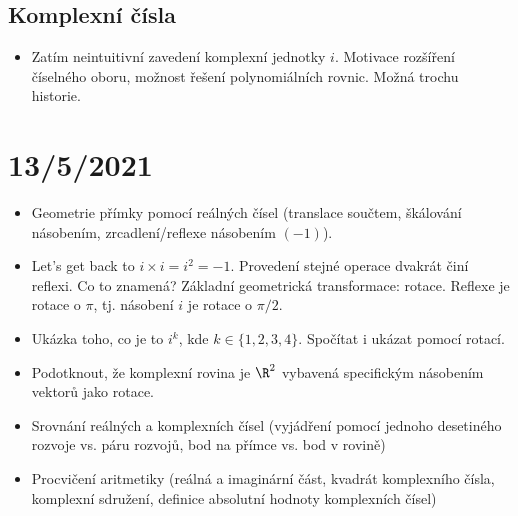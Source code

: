 \documentclass[11pt,a4paper]{article}
\begin{document}
        \subsection*{Komplexní čísla}
        \begin{itemize}
            \item Zatím neintuitivní zavedení komplexní jednotky $i$. Motivace rozšíření číselného oboru, možnost řešení polynomiálních rovnic. Možná trochu historie.
        \end{itemize}

    \section*{13/5/2021}
        \begin{itemize}
            \item Geometrie přímky pomocí reálných čísel (translace součtem, škálování násobením, zrcadlení/reflexe násobením $(-1)$).
            \item Let's get back to $i \times i = i^2 = -1$. Provedení stejné operace dvakrát činí reflexi. Co to znamená? Základní geometrická transformace: rotace. Reflexe je rotace o $\pi$, tj. násobení $i$ je rotace o $\pi/2$.
            \item Ukázka toho, co je to $i^k$, kde $k \in \{1,2,3,4\}$. Spočítat i ukázat pomocí rotací.
            \item Podotknout, že komplexní rovina je $\R^2$ vybavená specifickým násobením vektorů jako rotace.
            \item Srovnání reálných a komplexních čísel (vyjádření pomocí jednoho desetiného rozvoje vs. páru rozvojů, bod na přímce vs. bod v rovině)
            \item Procvičení aritmetiky (reálná a imaginární část, kvadrát komplexního čísla, komplexní sdružení, definice absolutní hodnoty komplexních čísel)
        \end{itemize}
\end{document}
